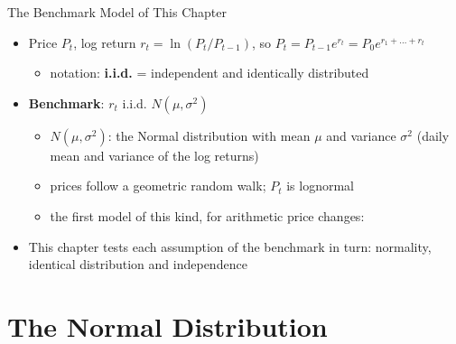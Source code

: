 \begin{frame}{The Benchmark Model of This Chapter}
\itemsize{\small}
\begin{itemize}
    \item Price $P_t$, log return $r_t = \ln(P_t/P_{t-1})$, so $P_t = P_{t-1}e^{r_t} = P_0 e^{r_1 + \dots + r_t}$
    \begin{itemize}
        \item notation: \textbf{i.i.d.} = independent and identically distributed
    \end{itemize}
    \item \textbf{Benchmark}: $r_t$ i.i.d. $N(\mu, \sigma^2)$
    \begin{itemize}
        \item $N(\mu, \sigma^2)$: the Normal distribution with mean $\mu$ and variance $\sigma^2$ (daily mean and variance of the log returns)
        \item prices follow a geometric random walk; $P_t$ is lognormal 
        \item the first model of this kind, for arithmetic price changes: 
    \end{itemize}
    \item This chapter tests each assumption of the benchmark in turn: normality, identical distribution and independence
\end{itemize}
\end{frame}


\section{The Normal Distribution}

